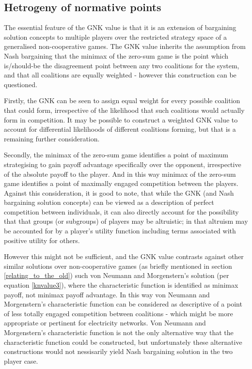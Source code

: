 \subsection{Hetrogeny of normative points}

The essential feature of the GNK value is that it is an extension of bargaining solution concepts to multiple players over the restricted strategy space of a generalised non-cooperative games.
The GNK value inherits the assumption from Nash bargaining that the minimax of the zero-sum game is the point which is/should-be the disagreement point between any two coalitions for the system, and that all coalitions are equally weighted - however this construction can be questioned.

Firstly, the GNK can be seen to assign equal weight for every possible coalition that could form, irrespective of the likelihood that such coalitions would actually form in competition.
It may be possible to construct a weighted GNK value to account for differential likelihoods of different coalitions forming, but that is a remaining further consideration.

Secondly, the minimax of the zero-sum game identifies a point of maximum strategising to gain payoff advantage specifically over the opponent, irrespective of the absolute payoff to the player.
And in this way minimax of the zero-sum game identifies a point of maximally engaged competition between the players.
Against this consideration, it is good to note, that while the GNK (and Nash bargaining solution concepts) can be viewed as a description of perfect competition between individuals, it can also directly account for the possibility that that groups (or subgroups) of players may be altruistic; in that altruism may be accounted for by a player's utility function including terms associated with positive utility for others.

However this might not be sufficient, and the GNK value contrasts against other similar solutions over non-cooperative games (as briefly mentioned in section \ref{relating_to_the_old}) such von Neumann and Morgenstern's solution (per equation \ref{knvalue3}), where the characteristic function is identified as minimax payoff, not minimax payoff advantage.
In this way von Neumann and Morgenstern's characteristic function can be considered as descriptive of a point of less totally engaged competition between coalitions - which might be more appropriate or pertinent for electricity networks.
Von Neumann and Morgenstern's characteristic function is not the only alternative way that the characteristic function could be constructed, but unfortunately these alternative constructions would not nessisarily yield Nash bargaining solution in the two player case.



